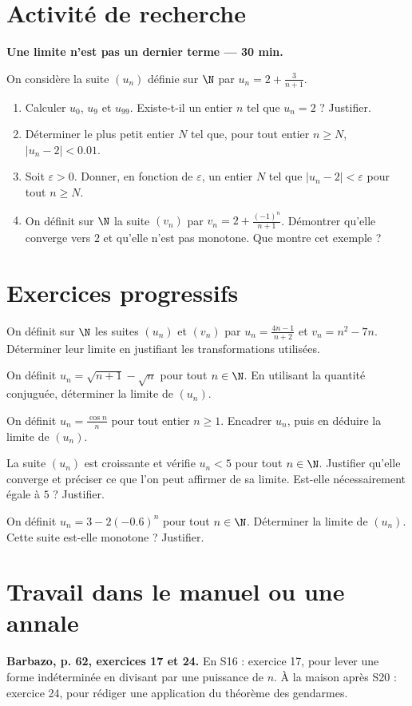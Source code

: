 \mxnewpage
\section{Activité de recherche}\textbf{Une limite n'est pas un dernier terme --- 30 min.}\par On considère la suite $(u_n)$ définie sur $\N$ par $u_n=2+\frac3{n+1}$.
\begin{enumerate}\item Calculer $u_0$, $u_9$ et $u_{99}$. Existe-t-il un entier $n$ tel que $u_n=2$ ? Justifier.
\item Déterminer le plus petit entier $N$ tel que, pour tout entier $n\ge N$, $|u_n-2|<\num{0,01}$.
\item Soit $\varepsilon>0$. Donner, en fonction de $\varepsilon$, un entier $N$ tel que $|u_n-2|<\varepsilon$ pour tout $n\ge N$.
\item On définit sur $\N$ la suite $(v_n)$ par $v_n=2+\frac{(-1)^n}{n+1}$. Démontrer qu'elle converge vers $2$ et qu'elle n'est pas monotone. Que montre cet exemple ?\end{enumerate}

\mxnewpage
\section{Exercices progressifs}

On définit sur $\N$ les suites $(u_n)$ et $(v_n)$ par $u_n=\frac{4n-1}{n+2}$ et $v_n=n^2-7n$. Déterminer leur limite en justifiant les transformations utilisées.

On définit $u_n=\sqrt{n+1}-\sqrt n$ pour tout $n\in\N$. En utilisant la quantité conjuguée, déterminer la limite de $(u_n)$.

On définit $u_n=\frac{\cos n}{n}$ pour tout entier $n\ge1$. Encadrer $u_n$, puis en déduire la limite de $(u_n)$.

La suite $(u_n)$ est croissante et vérifie $u_n<5$ pour tout $n\in\N$. Justifier qu'elle converge et préciser ce que l'on peut affirmer de sa limite. Est-elle nécessairement égale à $5$ ? Justifier.

On définit $u_n=3-2(-\num{0,6})^n$ pour tout $n\in\N$. Déterminer la limite de $(u_n)$. Cette suite est-elle monotone ? Justifier.

\section{Travail dans le manuel ou une annale}\textbf{Barbazo, p. 62, exercices 17 et 24.} En S16 : exercice 17, pour lever une forme indéterminée en divisant par une puissance de $n$. À la maison après S20 : exercice 24, pour rédiger une application du théorème des gendarmes.

